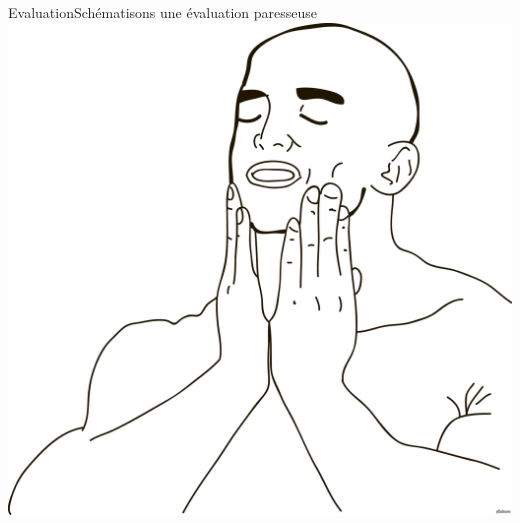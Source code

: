 \begin{frame}[fragile]{Evaluation}{Schématisons une évaluation paresseuse}
    \includegraphics[width=\textwidth]{meme/feels-good.png}
\end{frame}
